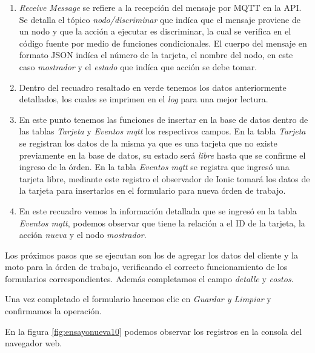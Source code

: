 \begin{enumerate}
\item \textit{Receive Message} se refiere a la recepción del mensaje por MQTT en la API. Se detalla el tópico \textit{nodo/discriminar} que indíca que el mensaje proviene de un nodo y que la acción a ejecutar es discriminar, la cual se verifica en el código fuente por medio de funciones condicionales. El cuerpo del mensaje en formato JSON indíca  el número de la tarjeta, el nombre del nodo, en este caso \textit{mostrador} y el \textit{estado} que indíca que acción se debe tomar.

\item Dentro del recuadro resaltado en verde tenemos los datos anteriormente detallados, los cuales se imprimen en el \textit{log} para una mejor lectura.

\item En este punto tenemos las funciones de insertar en la base de datos dentro de las tablas \textit{Tarjeta} y \textit{Eventos mqtt} los respectivos campos. En la tabla \textit{Tarjeta} se registran los datos de la misma ya que es una tarjeta que no existe previamente en la base de datos, su estado será \textit{libre} hasta que se confirme el ingreso de la órden. En la tabla \textit{Eventos mqtt} se registra que ingresó una tarjeta libre, mediante este registro el observador de Ionic tomará los datos de la tarjeta para insertarlos en el formulario para nueva órden de trabajo.

\item En este recuadro vemos la información detallada que se ingresó en la tabla \textit{Eventos mqtt}, podemos observar que tiene la relación a el ID de la tarjeta, la acción \textit{nueva} y el nodo \textit{mostrador}.
\end{enumerate}

Los próximos pasos que se ejecutan son los de agregar los datos del cliente y la moto para la órden de trabajo, verificando el correcto funcionamiento de los formularios correspondientes. Además completamos el campo \textit{detalle} y \textit{costos}.

Una vez completado el formulario hacemos clic en \textit{Guardar y Limpiar} y confirmamos la operación.

En la figura \ref{fig:ensayonueva10} podemos observar los registros en la consola del navegador web.

